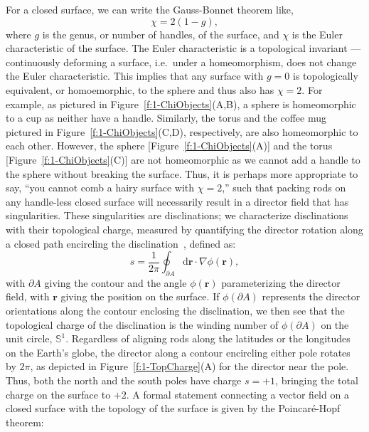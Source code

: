 For a closed surface, we can write the Gauss-Bonnet theorem like,
\begin{equation}
  \chi = 2(1-g),\label{e:1-GB1}
\end{equation}
where $g$ is the genus, or number of handles, of the surface, and $\chi$ is the Euler characteristic of the surface.
The Euler characteristic is a topological invariant --- continuously deforming a surface, i.e.\ under a homeomorphism, does not change the Euler characteristic.
This implies that any surface with $g=0$ is topologically equivalent, or homoemorphic, to the sphere and thus also has $\chi=2$.
For example, as pictured in Figure~\ref{f:1-ChiObjects}(A,B), a sphere is homeomorphic to a cup as neither have a handle.
Similarly, the torus and the coffee mug pictured in Figure~\ref{f:1-ChiObjects}(C,D), respectively, are also homeomorphic to each other.
However, the sphere [Figure~\ref{f:1-ChiObjects}(A)] and the torus [Figure~\ref{f:1-ChiObjects}(C)] are not homeomorphic as we cannot add a handle to the sphere without breaking the surface.
Thus, it is perhaps more appropriate to say, ``you cannot comb a hairy surface with $\chi=2$,'' such that packing rods on any handle-less closed surface will necessarily result in a director field that has singularities.
These singularities are disclinations; we characterize disclinations with their topological charge, measured by quantifying the director rotation along a closed path encircling the disclination~\cite{RN23,RN153,RN203}, defined as:
\begin{equation}
  s = \frac{1}{2 \pi}\oint_{\partial A} \textrm{d}\mathbf{r} \cdot \nabla\phi(\mathbf{r}),\label{eq:1-topCharge}
\end{equation}
with $\partial A$ giving the contour and the angle $\phi(\mathbf{r})$ parameterizing the director field, with $\mathbf{r}$ giving the position on the surface.
If $\phi(\partial A)$ represents the director orientations along the contour enclosing the disclination, we then see that the topological charge of the disclination is the winding number of $\phi(\partial A)$ on the unit circle, $\mathbb{S}^1$.
Regardless of aligning rods along the latitudes or the longitudes on the Earth's globe, the director along a contour encircling either pole rotates by $2 \pi$, as depicted in Figure~\ref{f:1-TopCharge}(A) for the director near the pole.
Thus, both the north and the south poles have charge $s = +1$, bringing the total charge on the surface to $+2$.
A formal statement connecting a vector field on a closed surface with the topology of the surface is given by the Poincar\'e-Hopf theorem:
